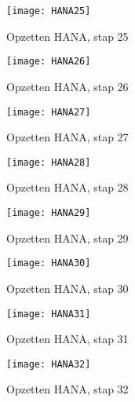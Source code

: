             \begin{figure}	
                \centering
                \texttt{[image: HANA25]}
                \caption{Opzetten HANA, stap 25} \label{HANA25}
            \end{figure}
            
            \begin{figure}	
                \centering
                \texttt{[image: HANA26]}
                \caption{Opzetten HANA, stap 26} \label{HANA26}
            \end{figure}
            
            \begin{figure}	
                \centering
                \texttt{[image: HANA27]}
                \caption{Opzetten HANA, stap 27} \label{HANA27}
            \end{figure}
            
            \begin{figure}	
                \centering
                \texttt{[image: HANA28]}
                \caption{Opzetten HANA, stap 28} \label{HANA28}
            \end{figure}
            
            \begin{figure}	
                \centering
                \texttt{[image: HANA29]}
                \caption{Opzetten HANA, stap 29} \label{HANA29}
            \end{figure}
        
            \begin{figure}	
                \centering
                \texttt{[image: HANA30]}
                \caption{Opzetten HANA, stap 30} \label{HANA30}
            \end{figure}
            
            \begin{figure}	
                \centering
                \texttt{[image: HANA31]}
                \caption{Opzetten HANA, stap 31} \label{HANA31}
            \end{figure}
            
            \begin{figure}	
                \centering
                \texttt{[image: HANA32]}
                \caption{Opzetten HANA, stap 32} \label{HANA32}
            \end{figure}
            
